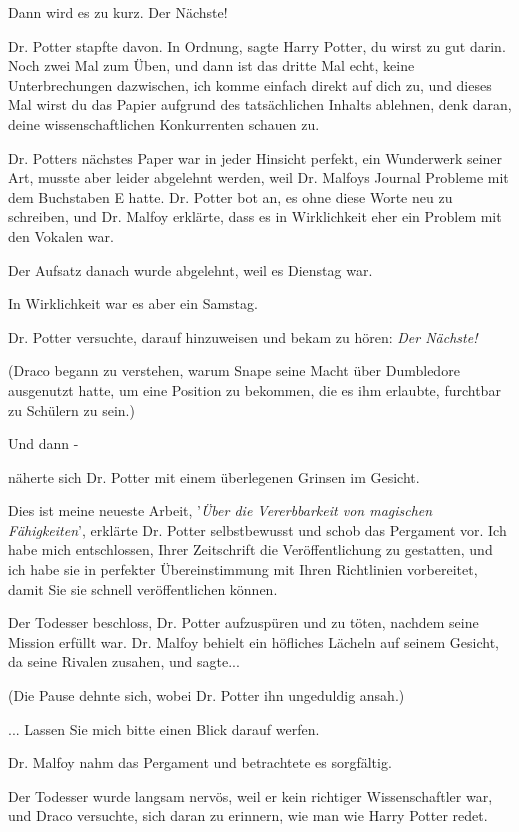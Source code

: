 \glqq{}Dann wird es zu kurz. Der Nächste!\grqq{}

Dr. Potter stapfte davon. \glqq{}In Ordnung\grqq{}, sagte Harry Potter,
\glqq{}du wirst zu gut darin. Noch zwei Mal zum Üben, und dann ist das dritte
Mal echt, keine Unterbrechungen dazwischen, ich komme einfach direkt auf dich
zu, und dieses Mal wirst du das Papier aufgrund des tatsächlichen Inhalts
ablehnen, denk daran, deine wissenschaftlichen Konkurrenten schauen zu.\grqq{}

Dr. Potters nächstes Paper war in jeder Hinsicht perfekt, ein Wunderwerk seiner
Art, musste aber leider abgelehnt werden, weil Dr. Malfoys Journal Probleme mit
dem Buchstaben E hatte. Dr. Potter bot an, es ohne diese Worte neu zu schreiben,
und Dr. Malfoy erklärte, dass es in Wirklichkeit eher ein Problem mit den
Vokalen war.

Der Aufsatz danach wurde abgelehnt, weil es Dienstag war.

In Wirklichkeit war es aber ein Samstag.

Dr. Potter versuchte, darauf hinzuweisen und bekam zu hören: \emph{\glqq{}Der
Nächste!\grqq{}}

(Draco begann zu verstehen, warum Snape seine Macht über Dumbledore ausgenutzt
hatte, um eine Position zu bekommen, die es ihm erlaubte, furchtbar zu Schülern
zu sein.)

Und dann -

näherte sich Dr. Potter mit einem überlegenen Grinsen im Gesicht.

\glqq{}Dies ist meine neueste Arbeit, '\emph{Über die Vererbbarkeit von
magischen Fähigkeiten}', erklärte Dr. Potter selbstbewusst und schob das
Pergament vor. \glqq{}Ich habe mich entschlossen, Ihrer Zeitschrift die
Veröffentlichung zu gestatten, und ich habe sie in perfekter Übereinstimmung mit
Ihren Richtlinien vorbereitet, damit Sie sie schnell veröffentlichen
können.\grqq{}

Der Todesser beschloss, Dr. Potter aufzuspüren und zu töten, nachdem seine
Mission erfüllt war. Dr. Malfoy behielt ein höfliches Lächeln auf seinem
Gesicht, da seine Rivalen zusahen, und sagte...

(Die Pause dehnte sich, wobei Dr. Potter ihn ungeduldig ansah.)

... \glqq{}Lassen Sie mich bitte einen Blick darauf werfen.\grqq{}

Dr. Malfoy nahm das Pergament und betrachtete es sorgfältig.

Der Todesser wurde langsam nervös, weil er kein richtiger Wissenschaftler war,
und Draco versuchte, sich daran zu erinnern, wie man wie Harry Potter redet.

